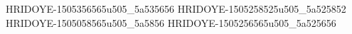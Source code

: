 HRIDOYE-1505356565u505_5a535656
HRIDOYE-1505258525u505_5a525852
HRIDOYE-1505058565u505_5a5856
HRIDOYE-1505256565u505_5a525656
